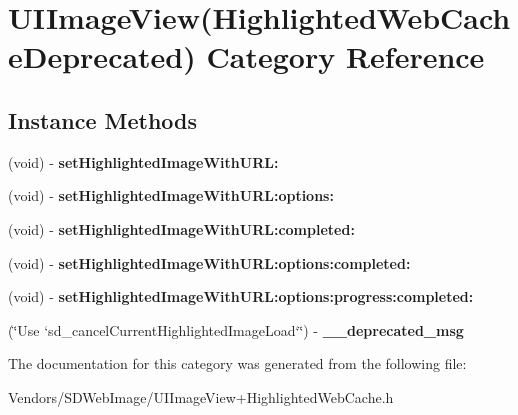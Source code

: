 \hypertarget{category_u_i_image_view_07_highlighted_web_cache_deprecated_08}{}\section{U\+I\+Image\+View(Highlighted\+Web\+Cache\+Deprecated) Category Reference}
\label{category_u_i_image_view_07_highlighted_web_cache_deprecated_08}
\subsection*{Instance Methods}
\begin{DoxyCompactItemize}
\item 
\hypertarget{category_u_i_image_view_07_highlighted_web_cache_deprecated_08_a89c7f910701991937845c9fa1a1ef034}{}(void) -\/ {\bfseries set\+Highlighted\+Image\+With\+U\+R\+L\+:}\label{category_u_i_image_view_07_highlighted_web_cache_deprecated_08_a89c7f910701991937845c9fa1a1ef034}

\item 
\hypertarget{category_u_i_image_view_07_highlighted_web_cache_deprecated_08_a53510e8a63181de6421318ddbf387d1c}{}(void) -\/ {\bfseries set\+Highlighted\+Image\+With\+U\+R\+L\+:options\+:}\label{category_u_i_image_view_07_highlighted_web_cache_deprecated_08_a53510e8a63181de6421318ddbf387d1c}

\item 
\hypertarget{category_u_i_image_view_07_highlighted_web_cache_deprecated_08_af9b5c1b6ed89a98a26c832b1bd2c3411}{}(void) -\/ {\bfseries set\+Highlighted\+Image\+With\+U\+R\+L\+:completed\+:}\label{category_u_i_image_view_07_highlighted_web_cache_deprecated_08_af9b5c1b6ed89a98a26c832b1bd2c3411}

\item 
\hypertarget{category_u_i_image_view_07_highlighted_web_cache_deprecated_08_a5a641bac2737b22c2922d7963f80cd9e}{}(void) -\/ {\bfseries set\+Highlighted\+Image\+With\+U\+R\+L\+:options\+:completed\+:}\label{category_u_i_image_view_07_highlighted_web_cache_deprecated_08_a5a641bac2737b22c2922d7963f80cd9e}

\item 
\hypertarget{category_u_i_image_view_07_highlighted_web_cache_deprecated_08_a4f778950373e6b026d38094862776c66}{}(void) -\/ {\bfseries set\+Highlighted\+Image\+With\+U\+R\+L\+:options\+:progress\+:completed\+:}\label{category_u_i_image_view_07_highlighted_web_cache_deprecated_08_a4f778950373e6b026d38094862776c66}

\item 
\hypertarget{category_u_i_image_view_07_highlighted_web_cache_deprecated_08_afb53abd0302272b5f57ad21a8a5b8444}{}(\char`\"{}Use `sd\+\_\+cancel\+Current\+Highlighted\+Image\+Load`\char`\"{}) -\/ {\bfseries \+\_\+\+\_\+deprecated\+\_\+msg}\label{category_u_i_image_view_07_highlighted_web_cache_deprecated_08_afb53abd0302272b5f57ad21a8a5b8444}

\end{DoxyCompactItemize}


The documentation for this category was generated from the following file\+:\begin{DoxyCompactItemize}
\item 
Vendors/\+S\+D\+Web\+Image/U\+I\+Image\+View+\+Highlighted\+Web\+Cache.\+h\end{DoxyCompactItemize}
